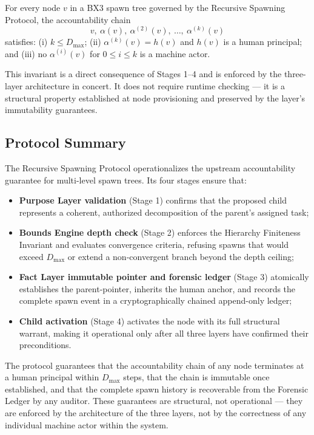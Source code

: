 \begin{invariant}
\label{inv:rsp-termination}
For every node $v$ in a BX3 spawn tree governed by the Recursive Spawning Protocol, the accountability chain
\[
v,\ \alpha(v),\ \alpha^{(2)}(v),\ \ldots,\ \alpha^{(k)}(v)
\]
satisfies: (i) $k \leq D_{\max}$; (ii) $\alpha^{(k)}(v) = h(v)$ and $h(v)$ is a human principal; and (iii) no $\alpha^{(i)}(v)$ for $0 \leq i \leq k$ is a machine actor.
\end{invariant}

This invariant is a direct consequence of Stages 1–4 and is enforced by the three-layer architecture in concert. It does not require runtime checking — it is a structural property established at node provisioning and preserved by the \fact{} layer's immutability guarantees.

\subsection{Protocol Summary}
\label{sec:rsp-summary}

The Recursive Spawning Protocol operationalizes the upstream accountability guarantee for multi-level spawn trees. Its four stages ensure that:

\begin{itemize}\itemsep=0pt
\item \textbf{Purpose Layer validation} (Stage 1) confirms that the proposed child represents a coherent, authorized decomposition of the parent's assigned task;
\item \textbf{Bounds Engine depth check} (Stage 2) enforces the Hierarchy Finiteness Invariant and evaluates convergence criteria, refusing spawns that would exceed $D_{\max}$ or extend a non-convergent branch beyond the depth ceiling;
\item \textbf{Fact Layer immutable pointer and forensic ledger} (Stage 3) atomically establishes the parent-pointer, inherits the human anchor, and records the complete spawn event in a cryptographically chained append-only ledger;
\item \textbf{Child activation} (Stage 4) activates the node with its full structural warrant, making it operational only after all three layers have confirmed their preconditions.
\end{itemize}

The protocol guarantees that the accountability chain of any node terminates at a human principal within $D_{\max}$ steps, that the chain is immutable once established, and that the complete spawn history is recoverable from the Forensic Ledger by any auditor. These guarantees are structural, not operational — they are enforced by the architecture of the three layers, not by the correctness of any individual machine actor within the system.